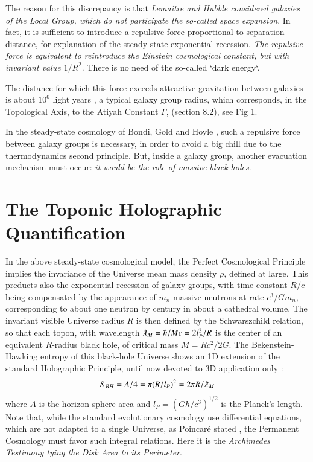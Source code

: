 \documentclass[twoside,draft]{article}
\begin{document}
\begin{sloppypar}
The reason for this discrepancy is that \textit{Lema\^itre and Hubble considered galaxies of the Local Group, which do not participate the so-called space expansion}. In fact, it is sufficient to introduce a repulsive force proportional to separation distance, for explanation of the steady-state exponential recession. \textit{The repulsive force is equivalent to reintroduce  the Einstein cosmological constant, but with invariant value} $1/R^{2}$. There is no need of the so-called `dark energy`.

The distance for which this force exceeds attractive gravitation between galaxies is about $10^{6}$ light years \cite{Sanchez1}, a typical galaxy group radius, which corresponds, in the Topological Axis, to the Atiyah Constant $\Gamma$, (section 8.2), see Fig 1.

In the steady-state cosmology of Bondi, Gold and Hoyle \cite{Sanchez1}, such a repulsive force between galaxy groups is necessary, in order to avoid a big chill due to the thermodynamics second principle. But, inside a galaxy group, another evacuation mechanism must occur: \textit{it would be the role of massive black holes}.

\section{The Toponic Holographic Quantification}

In the above steady-state cosmological model, the Perfect Cosmological Principle implies the invariance of the Universe mean mass density $\rho$, defined at large. This preducts also the exponential recession of galaxy groups, with time constant $R/c$ being compensated by the appearance of $m_n$ massive neutrons at rate $c^{3} /Gm_{n}$, 
corresponding to about one neutron by century in about a cathedral volume. 
The invariant visible Universe radius $R$ is then defined by the Schwarszchild relation, so that each topon, with wavelength $\lambdabar_M = \hbar/Mc = 2l_{P}^{2} /R$ is the center of an equivalent $R$-radius black hole, of critical mass $M = Rc^{2} /2G$. The Bekenstein-Hawking entropy of this black-hole Universe shows an 1D extension \cite{Sanchez1} of the standard Holographic Principle, until now devoted to 3D application only \cite{Bousso}:
\begin{equation}
S_{BH} = A/4 = \pi(R/l_{P})^{2} = 2\pi R/\lambdabar_{M}
\end{equation}
where $A$ is the horizon sphere area and $l_{P} = (G\hbar/c^{3} )^{1/2}$ is the Planck's length. Note that, while the standard evolutionary cosmology use differential equations, which are not adapted to a single Universe, as Poincar\'{e} stated \cite{Sanchez1}, the Permanent Cosmology must favor such integral relations. Here it is the \textit{Archimedes Testimony tying the Disk Area to its Perimeter}.


\end{sloppypar}
\end{document}
